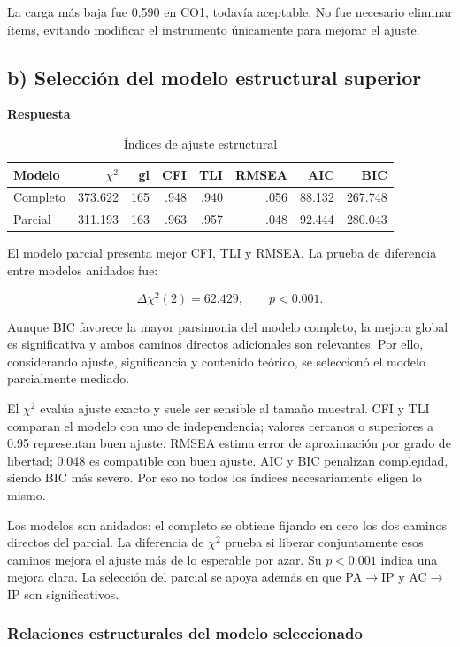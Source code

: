\documentclass[11pt,letterpaper]{article}
\begin{document}
La carga más baja fue 0.590 en CO1, todavía aceptable. No fue necesario eliminar ítems, evitando modificar el instrumento únicamente para mejorar el ajuste.

\subsection{b) Selección del modelo estructural superior}

\textbf{Respuesta}

\begin{table}[H]
\centering
\caption{Índices de ajuste estructural}
\begin{tabular}{lrrrrrrr}
\toprule
Modelo & $\chi^2$ & gl & CFI & TLI & RMSEA & AIC & BIC\\
\midrule
Completo & 373.622 & 165 & .948 & .940 & .056 & 88.132 & 267.748\\
Parcial & 311.193 & 163 & .963 & .957 & .048 & 92.444 & 280.043\\
\bottomrule
\end{tabular}
\end{table}

El modelo parcial presenta mejor CFI, TLI y RMSEA. La prueba de diferencia entre modelos anidados fue:

\[
\Delta\chi^2(2)=62.429,\qquad p<0.001.
\]

Aunque BIC favorece la mayor parsimonia del modelo completo, la mejora global es significativa y ambos caminos directos adicionales son relevantes. Por ello, considerando ajuste, significancia y contenido teórico, se seleccionó el modelo parcialmente mediado.

El $\chi^2$ evalúa ajuste exacto y suele ser sensible al tamaño muestral. CFI y TLI comparan el modelo con uno de independencia; valores cercanos o superiores a 0.95 representan buen ajuste. RMSEA estima error de aproximación por grado de libertad; 0.048 es compatible con buen ajuste. AIC y BIC penalizan complejidad, siendo BIC más severo. Por eso no todos los índices necesariamente eligen lo mismo.

Los modelos son anidados: el completo se obtiene fijando en cero los dos caminos directos del parcial. La diferencia de $\chi^2$ prueba si liberar conjuntamente esos caminos mejora el ajuste más de lo esperable por azar. Su $p<0.001$ indica una mejora clara. La selección del parcial se apoya además en que PA$\rightarrow$IP y AC$\rightarrow$IP son significativos.

\subsubsection*{Relaciones estructurales del modelo seleccionado}
\end{document}
